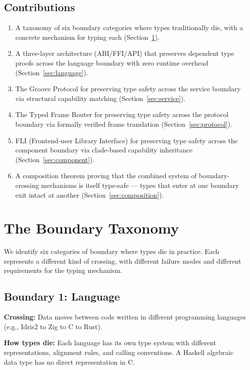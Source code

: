 \documentclass[11pt,a4paper]{article}
\begin{document}
\subsection{Contributions}

\begin{enumerate}
\item A taxonomy of six boundary categories where types traditionally
  die, with a concrete mechanism for typing each (Section~\ref{sec:taxonomy}).
\item A three-layer architecture (ABI/FFI/API) that preserves dependent
  type proofs across the language boundary with zero runtime overhead
  (Section~\ref{sec:language}).
\item The Groove Protocol for preserving type safety across the service
  boundary via structural capability matching
  (Section~\ref{sec:service}).
\item The Typed Frame Router for preserving type safety across the
  protocol boundary via formally verified frame translation
  (Section~\ref{sec:protocol}).
\item FLI (Frontend-user Library Interface) for preserving type safety
  across the component boundary via clade-based capability inheritance
  (Section~\ref{sec:component}).
\item A composition theorem proving that the combined system of
  boundary-crossing mechanisms is itself type-safe --- types that enter
  at one boundary exit intact at another (Section~\ref{sec:composition}).
\end{enumerate}

\section{The Boundary Taxonomy}
\label{sec:taxonomy}

We identify six categories of boundary where types die in practice.
Each represents a different kind of crossing, with different failure
modes and different requirements for the typing mechanism.

\subsection{Boundary 1: Language}

\textbf{Crossing:} Data moves between code written in different
programming languages (e.g., Idris2 to Zig to C to Rust).

\textbf{How types die:} Each language has its own type system with
different representations, alignment rules, and calling conventions.
A Haskell algebraic data type has no direct representation in C.
\end{document}
